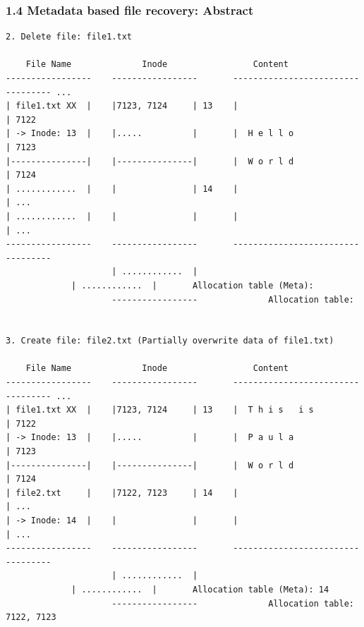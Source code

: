 \begin{frame}[fragile]
  \frametitle{1.4 Metadata based file recovery: Abstract}
  \begin{lstlisting}[basicstyle=\tiny\ttfamily]
2. Delete file: file1.txt

    File Name              Inode                 Content     
-----------------    -----------------       ---------------------------------- ...
| file1.txt XX  |    |7123, 7124     | 13    |                                | 7122
| -> Inode: 13  |    |.....          |       |  H e l l o                     | 7123
|---------------|    |---------------|       |  W o r l d                     | 7124
| ............  |    |               | 14    |                                | ...
| ............  |    |               |       |                                | ...
-----------------    -----------------       ---------------------------------- 
                     | ............  |
		     | ............  |       Allocation table (Meta): 
                     -----------------              Allocation table: 


3. Create file: file2.txt (Partially overwrite data of file1.txt)

    File Name              Inode                 Content     
-----------------    -----------------       ---------------------------------- ...
| file1.txt XX  |    |7123, 7124     | 13    |  T h i s   i s                 | 7122
| -> Inode: 13  |    |.....          |       |  P a u l a                     | 7123
|---------------|    |---------------|       |  W o r l d                     | 7124
| file2.txt     |    |7122, 7123     | 14    |                                | ...
| -> Inode: 14  |    |               |       |                                | ...
-----------------    -----------------       ---------------------------------- 
                     | ............  |
		     | ............  |       Allocation table (Meta): 14
                     -----------------              Allocation table: 7122, 7123
  \end{lstlisting}
\end{frame}


